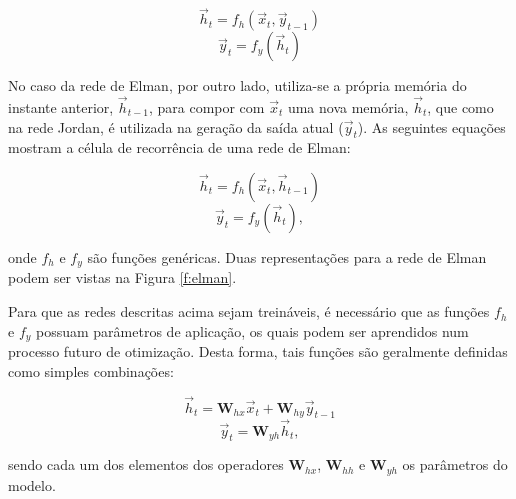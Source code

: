       \begin{equation} \label{e:jordan_ht}
        \vec{h}_t = f_h(\vec{x}_t, \vec{y}_{t-1})
      \end{equation}
      \begin{equation} \label{e:jordan_yt}
        \vec{y}_t = f_y(\vec{h}_t)
      \end{equation}

      No caso da rede de Elman, por outro lado, utiliza-se a própria memória do instante anterior, $\vec{h}_{t-1}$, para compor com $\vec{x}_t$ uma nova memória, $\vec{h}_t$, que como na rede Jordan, é utilizada na geração da saída atual ($\vec{y}_t$). As seguintes equações mostram a célula de recorrência de uma rede de Elman:

      \begin{equation} \label{e:elman_ht}
        \vec{h}_t = f_h(\vec{x}_t, \vec{h}_{t-1})
      \end{equation}
      \begin{equation} \label{e:elman_yt}
        \vec{y}_t = f_y(\vec{h}_t)
        ,
      \end{equation}

    \noindent onde $f_h$ e $f_y$ são funções genéricas. Duas representações para a rede de Elman podem ser vistas na Figura \ref{f:elman}.

      Para que as redes descritas acima sejam treináveis, é necessário que as funções $f_h$ e $f_y$ possuam parâmetros de aplicação, os quais podem ser aprendidos num processo futuro de otimização. Desta forma, tais funções são geralmente definidas como simples combinações:

      \begin{equation} \label{e:jordan_linear_part_ht}
        \vec{h}_t = \boldsymbol{W}_{hx} \vec{x}_t + \boldsymbol{W}_{hy} \vec{y}_{t-1}
      \end{equation}
      \begin{equation} \label{e:jordan_linear_part_yt}
        \vec{y}_t = \boldsymbol{W}_{yh} \vec{h}_t
        ,
      \end{equation}

      \noindent sendo cada um dos elementos dos operadores $\boldsymbol{W}_{hx}$, $\boldsymbol{W}_{hh}$ e $\boldsymbol{W}_{yh}$ os parâmetros do modelo.

